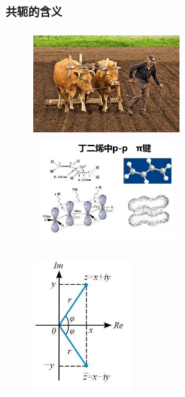\frame
{
	\frametitle{共轭的含义}
\begin{minipage}{0.63\textwidth}
\begin{figure}[h!]
\vskip -23pt
\centering
\includegraphics[height=1.6in,width=2.2in,viewport=0 0 600 490,clip]{Figures/Bi-Yoke_1.jpg}
\vskip 2pt
\includegraphics[height=1.5in,width=2.2in,viewport=0 0 750 530,clip]{Figures/Conjugate_Pi-bond.png}
\label{Conjugate_1}
\end{figure}
\end{minipage}
\begin{minipage}{0.35\textwidth}
\begin{figure}[h!]
\centering
\includegraphics[height=2.2in,width=1.5in,viewport=0 0 250 390,clip]{Figures/Conjugate_complex.jpg}
\label{Conjugate_2}
\end{figure}
\end{minipage}
}

